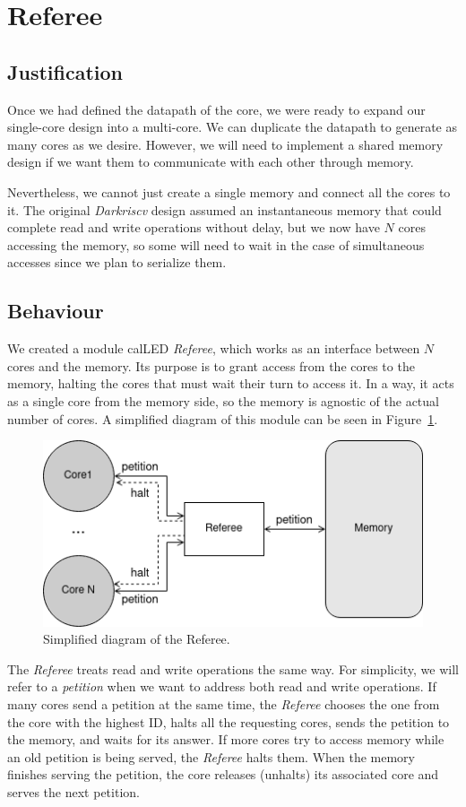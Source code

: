 \section{Referee} \label{sec:referee}

\subsection{Justification} \label{referee-justification}
Once we had defined the datapath of the core, we were ready to expand our single-core design into a multi-core.
We can duplicate the datapath to generate as many cores as we desire. However, we will need to implement a shared memory design if we want them to communicate with each other through memory. 

Nevertheless, we cannot just create a single memory and connect all the cores to it. 
The original \textit{Darkriscv} design assumed an instantaneous memory that could complete read and write operations without delay, but we now have $N$ cores accessing the memory, so some will need to wait in the case of simultaneous accesses since we plan to serialize them.


\subsection{Behaviour} \label{referee-behaviour}
We created a module calLED \textit{Referee}, which works as an interface between $N$ cores and the memory.
Its purpose is to grant access from the cores to the memory, halting the cores that must wait their turn to access it.
In a way, it acts as a single core from the memory side, so the memory is agnostic of the actual number of cores.
A simplified diagram of this module can be seen in Figure~\ref{referee-fig}.

\begin{figure}[h!]
    \centering
    \includegraphics[width=.5\textwidth]{images/Referee_fig.png}
    \caption{Simplified diagram of the Referee.}
    \label{referee-fig}
\end{figure}

The \textit{Referee} treats read and write operations the same way.
For simplicity, we will refer to a \textit{petition} when we want to address both read and write operations.
If many cores send a petition at the same time, the \textit{Referee} chooses the one from the core with the highest ID, halts all the requesting cores, sends the petition to the memory, and waits for its answer.
If more cores try to access memory while an old petition is being served, the \textit{Referee} halts them.
When the memory finishes serving the petition, the core releases (unhalts) its associated core and serves the next petition.

